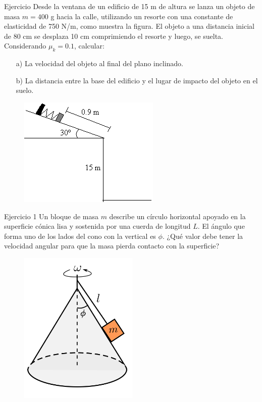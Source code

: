     \begin{frame}{Ejercicio}
    Desde la ventana de un edificio de 15 m de altura se lanza un objeto de masa $m = 400$ g hacia la calle, utilizando un resorte con una constante de elasticidad de 750  N/m, como muestra la figura. El objeto a una distancia inicial de 80 cm se desplaza 10 cm comprimiendo el resorte y luego, se suelta. Considerando $\mu_k=0.1$, calcular:
        \begin{itemize}
            \item[a)] La velocidad del objeto al final del plano inclinado.
            \item[b)] La distancia entre la base del edificio y el lugar de impacto del objeto en el suelo.
        \end{itemize}
        \begin{figure}
            \centering
            \includegraphics[width=0.35\linewidth]{figures/plano-resorte-1.png}
        \end{figure}
    \end{frame}

  \begin{frame}{Ejercicio 1}
        Un bloque de masa $ m $ describe un círculo horizontal apoyado en la superficie cónica lisa y sostenida por una cuerda de longitud $ L $. El ángulo que forma uno de los lados del cono con la vertical es $\phi$. ¿Qué valor debe tener la velocidad angular para que la masa pierda contacto con la superficie?

        \begin{figure}
            \centering
            \includegraphics[width=0.25\linewidth]{figures/cono.png}
        \end{figure}
  \end{frame}

